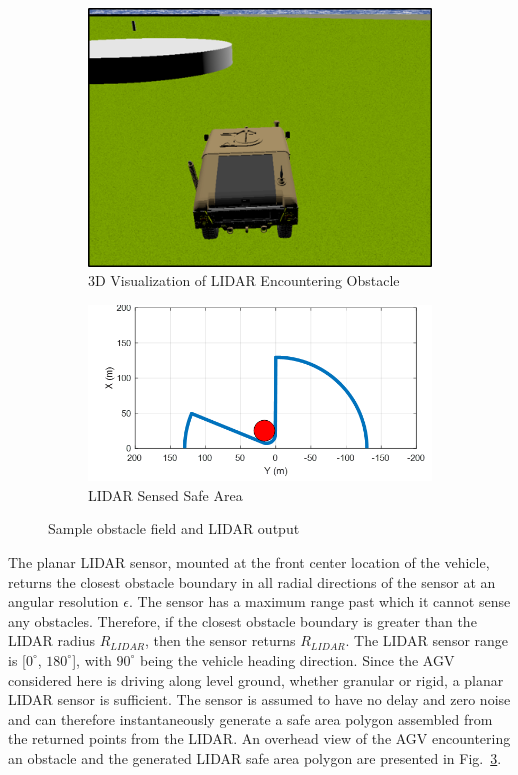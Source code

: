 \documentclass[12pt,twocolumn]{article}
\begin{document}
\begin{figure}
	\centering
	\begin{subfigure}[b]{\columnwidth}
		\centering
		\includegraphics[width=0.8\columnwidth]{Figs/incomingObst.png}
		\caption{{\small 3D Visualization of LIDAR Encountering Obstacle}}   
		\label{fig:obstacle_field_3D}
	\end{subfigure}

	\hfill
	\begin{subfigure}[b]{\columnwidth}
		\centering
		\includegraphics[width=\columnwidth]{Figs/obstLIDAR.png}
		\caption{\small LIDAR Sensed Safe Area}   
		\label{fig:obstacle_field_LIDAR}
	\end{subfigure}
	\caption{\small Sample obstacle field and LIDAR output}
	\label{fig:LIDARExample}
\end{figure}

The planar LIDAR sensor, mounted at the front center location of the vehicle, returns the closest obstacle boundary in all radial directions of the sensor at an angular resolution $\epsilon$. The sensor has a maximum range past which it cannot sense any obstacles. Therefore, if the closest obstacle boundary is greater than the LIDAR radius $R_{LIDAR}$, then the sensor returns $R_{LIDAR}$. The LIDAR sensor range is [$0^\circ$, $180^\circ$], with $90^\circ$ being the vehicle heading direction. Since the AGV considered here is driving along level ground, whether granular or rigid, a planar LIDAR sensor is sufficient. The sensor is assumed to have no delay and zero noise and can therefore instantaneously generate a safe area polygon assembled from the returned points from the LIDAR. An overhead view of the AGV encountering an obstacle and the generated LIDAR safe area polygon are presented in Fig.~\ref{fig:LIDARExample}. 
%
\end{document}
